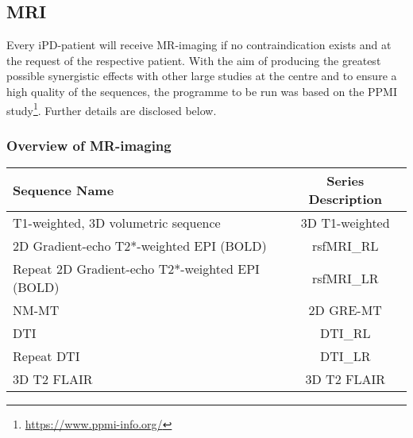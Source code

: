 \subsection{\ac{MRI}}
Every \ac{iPD}-patient will receive MR-imaging if no contraindication exists and at the request of the respective patient. With the aim of producing the greatest possible synergistic effects with other large studies at the centre and to ensure a high quality of the sequences, the programme to be run was based on the PPMI study\footnote{\url{https://www.ppmi-info.org/}}. Further details are disclosed below.

\subsubsection{Overview of MR-imaging}
\begin{table}[h]
\small
\begin{tabularx}{1\textwidth}{@{}X *{1}{C}@{}}
\toprule
\textbf{Sequence Name} 						& \textbf{Series Description }	\\
\midrule
T1-weighted, 3D volumetric sequence 			& 3D T1-weighted 		\\
2D Gradient-echo T2*-weighted EPI (BOLD) 		& rsfMRI\_RL 			\\
Repeat 2D Gradient-echo T2*-weighted EPI (BOLD) 	& rsfMRI\_LR 			\\
NM-MT 										& 2D GRE-MT 			\\
DTI 											& DTI\_RL 			\\
Repeat DTI 									& DTI\_LR 			\\
3D T2 FLAIR 									& 3D T2 FLAIR 		\\
\bottomrule
\end{tabularx}
\end{table}

